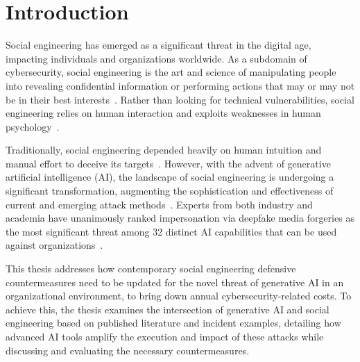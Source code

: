 \chapter{Introduction\label{chapter:intro}}
\begin{comment}
- Independent of platform, age of equipment, software, antivirus, firewall (defining social engineering)
- pääasia päälauseeseen tai paragrafin ensimmäiseen virkkeeseen
- vältä liian pitkiä ja monimutkaisia rakenteita, mutta tuo selkeästi esiin asioiden väliset syyt ja seuraukset
- lauseenvastikkeiden käyttö vain niille sopivissa paikoissa
- havainnoillisesti käyttäen konkretisointeja, esimerkkejä, case-study tutkimuksia, kuvia, taulukoita
- 

\end{comment}


%
%
Social engineering has emerged as a significant threat in the digital age, impacting individuals and organizations worldwide. As a subdomain of cybersecurity, social engineering is the art and science of manipulating people into revealing confidential information or performing actions that may or may not be in their best interests~\citep{hadnagy_Social_Engineering_The_Science_2018}. Rather than looking for technical vulnerabilities, social engineering relies on human interaction and exploits weaknesses in human psychology~\citep{wang_Defining_Social_Engineering_2020}.





%
%
Traditionally, social engineering depended heavily on human intuition and manual effort to deceive its targets~\citep{mitnick_The_Art_of_Deception_2003, mirsky_Threat_Offensive_AI_Organizations_2023}. However, with the advent of generative artificial intelligence (AI), the landscape of social engineering is undergoing a significant transformation, augmenting the sophistication and effectiveness of current and emerging attack methods~\citep{fakhouri_AI_Driven_Solutions_SE_Attacks_2024, fbi_Internet_Crime_Report_2023}. Experts from both industry and academia have unanimously ranked impersonation via deepfake media forgeries as the most significant threat among 32 distinct AI capabilities that can be used against organizations~\citep{mirsky_Threat_Offensive_AI_Organizations_2023}.







%
%
This thesis addresses how contemporary social engineering defensive countermeasures need to be updated for the novel threat of generative AI in an organizational environment, to bring down annual cybersecurity-related costs. To achieve this, the thesis examines the intersection of generative AI and social engineering based on published literature and incident examples, detailing how advanced AI tools amplify the execution and impact of these attacks while discussing and evaluating the necessary countermeasures.





